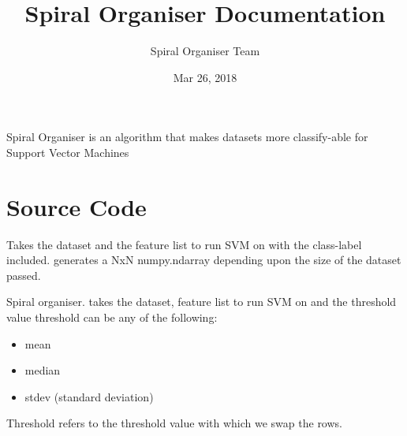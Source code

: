 \documentclass[letterpaper,10pt,english]{sphinxmanual}
\title{Spiral Organiser Documentation}
\date{Mar 26, 2018}
\author{Spiral Organiser Team}
\begin{document}
\maketitle
\sphinxtableofcontents
{}\label{\detokenize{index::doc}}


Spiral Organiser is an algorithm that makes datasets more classify-able for Support Vector Machines


\chapter{Source Code}
\label{\detokenize{code:source-code}}\label{\detokenize{code:welcome-to-spiral-organiser-s-documentation}}\label{\detokenize{code::doc}}\label{\detokenize{code:module-spiralOrg}}

\begin{fulllineitems}
\label{\detokenize{code:spiralOrg.dataclean}}
Takes the dataset and the feature list to run SVM on with the class-label included.
generates a NxN numpy.ndarray depending upon the size of the dataset passed.

\end{fulllineitems}


\begin{fulllineitems}
\label{\detokenize{code:spiralOrg.organise}}
Spiral organiser. takes the dataset, feature list to run SVM on and the threshold value
threshold can be any of the following:
\begin{itemize}
\item {} 
mean

\item {} 
median

\item {} 
stdev (standard deviation)

\end{itemize}

Threshold refers to the threshold value with which we swap the rows.

\end{fulllineitems}
\end{document}
